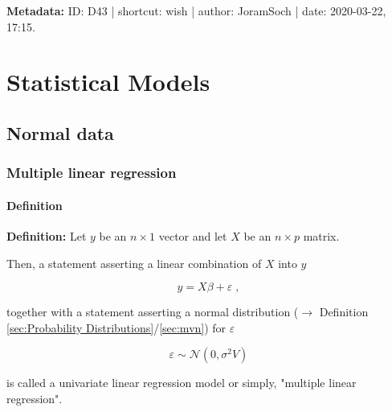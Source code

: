 \documentclass[a4paper,12pt,twoside]{book}
\begin{document}
\vspace{1em}
\textbf{Metadata:} ID: D43 | shortcut: wish | author: JoramSoch | date: 2020-03-22, 17:15.
\vspace{1em}





\chapter{Statistical Models} \label{sec:Statistical Models} \newpage

\pagebreak
\section{Normal data}

\subsection{Multiple linear regression}

\subsubsection[\textit{Definition}]{Definition} \label{sec:mlr}
\setcounter{equation}{0}

\textbf{Definition:} Let $y$ be an $n \times 1$ vector and let $X$ be an $n \times p$ matrix.

Then, a statement asserting a linear combination of $X$ into $y$

\begin{equation} \label{eq:mlr-mlr-model}
y = X\beta + \varepsilon \; ,
\end{equation}

together with a statement asserting a normal distribution ($\rightarrow$ Definition \ref{sec:Probability Distributions}/\ref{sec:mvn}) for $\varepsilon$

\begin{equation} \label{eq:mlr-mlr-noise}
\varepsilon \sim \mathcal{N}(0, \sigma^2 V)
\end{equation}

is called a univariate linear regression model or simply, "multiple linear regression".
\end{document}
